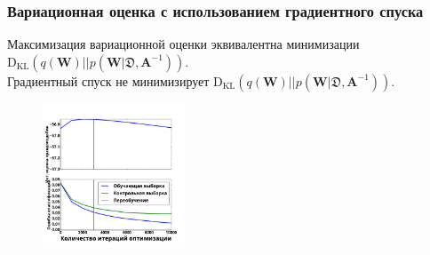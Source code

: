 \documentclass[usenames,dvipsnames,11pt,pdf,utf8,russian,aspectratio=169]{beamer}
\begin{document}
\begin{frame}
\frametitle{Вариационная оценка с использованием градиентного спуска}
\footnotesize
Максимизация вариационной оценки эквивалентна минимизации $\text{D}_{\text{KL}}(q(\mathbf{W})||p(\mathbf{W} | \mathfrak{D},\mathbf{A}^{-1}))$.\\
Градиентный спуск не минимизирует $\text{D}_{\text{KL}}(q(\mathbf{W})||p(\mathbf{W} | \mathfrak{D},\mathbf{A}^{-1}))$.
\begin{multicols}{2}

\begin{figure}
\end{figure}

\columnbreak


\begin{figure}
{\includegraphics[width=0.38\textwidth]{./slide_plots/sgd_show.pdf}}
\end{figure}
\end{multicols}
\end{frame}
\end{document}
